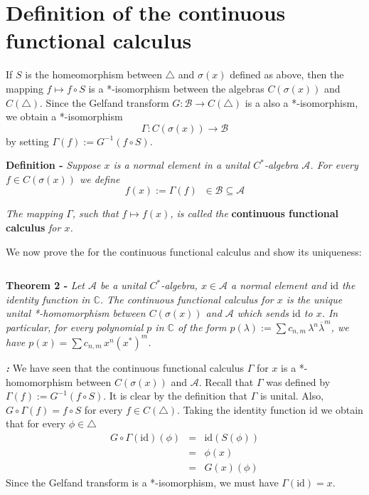 \documentclass[12pt]{article}
\begin{document}
\section{Definition of the continuous functional calculus}

If $S$ is the homeomorphism between $\bigtriangleup$ and $\sigma(x)$ defined as above, then the mapping $f \mapsto f \circ S$ is a *-isomorphism between the algebras $C(\sigma(x))$ and $C(\bigtriangleup)$. Since the Gelfand transform $G : \mathcal{B} \longrightarrow C(\bigtriangleup)$ is a also a *-isomorphism, we obtain a *-isomorphism
\begin{displaymath}
\Gamma : C(\sigma(x)) \longrightarrow \mathcal{B}
\end{displaymath}
by setting $\Gamma (f):= G^{-1}(f \circ S)$.

{\bf Definition -} \emph{Suppose $x$ is a normal element in a unital $C^*$-algebra $\mathcal{A}$. For every $f \in C(\sigma(x))$ we define}
\begin{displaymath}
f(x):=\Gamma(f)\;\; \in \mathcal{B} \subseteq \mathcal{A}
\end{displaymath}

\emph{The mapping $\Gamma$, such that $f \mapsto f(x)$, is called the} {\bf continuous functional calculus} \emph{for $x$.}

We now prove the   for the continuous functional calculus and show its uniqueness:

$\,$

{\bf Theorem 2 -} \emph{Let $\mathcal{A}$ be a unital $C^*$-algebra, $x \in \mathcal{A}$ a normal element and $\mathrm{id}$ the identity function in $\mathbb{C}$. The continuous functional calculus for $x$ is the unique unital *-homomorphism between $C(\sigma(x))$ and $\mathcal{A}$ which sends $\mathrm{id}$ to $x$. In particular, for every polynomial $p$ in $\mathbb{C}$ of the form $p(\lambda):= \sum c_{n,m}\, \lambda^n \overline{\lambda}^m$, we have $p(x) = \sum c_{n,m}\, x^n (x^*)^m$.}

{\bf \emph{ :}} We have seen that the continuous functional calculus $\Gamma$ for $x$ is a *-homomorphism between $C(\sigma(x))$ and $\mathcal{A}$. Recall that $\Gamma$ was defined by $\Gamma (f) := G^{-1} (f \circ S)$. It is clear by the definition that $\Gamma$ is unital. Also, $G \circ \Gamma (f) = f \circ S$ for every $f \in C(\bigtriangleup)$. Taking the identity function $\mathrm{id}$ we obtain that for every $\phi \in \bigtriangleup$
\begin{eqnarray*}
G \circ \Gamma (\mathrm{id}) (\phi) & = & \mathrm{id} (S(\phi)) \\
& = & \phi(x) \\
& = & G(x) (\phi)
\end{eqnarray*}
Since the Gelfand transform is a *-isomorphism, we must have $\Gamma(\mathrm{id}) = x$. 
\end{document}
